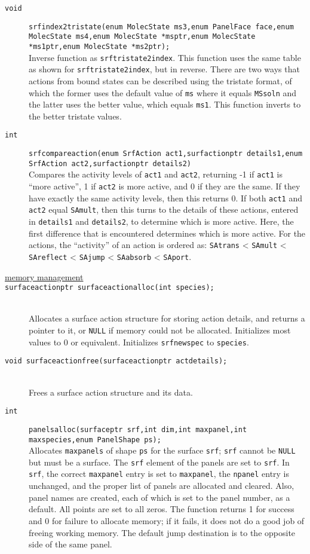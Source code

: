 \documentclass {book}
\newcommand {\ttt} {\texttt}
\begin{document}
\begin{description}
\item[\ttt{void}]
\ttt{srfindex2tristate(enum MolecState ms3,enum PanelFace face,enum MolecState ms4,enum MolecState *msptr,enum MolecState *ms1ptr,enum MolecState *ms2ptr);}
\hfill \\
Inverse function as \ttt{srftristate2index}. This function uses the same table as shown for \ttt{srftristate2index}, but in reverse. There are two ways that actions from bound states can be described using the tristate format, of which the former uses the default value of \ttt{ms} where it equals \ttt{MSsoln} and the latter uses the better value, which equals \ttt{ms1}. This function inverts to the better tristate values.

\item[\ttt{int}]
\ttt{srfcompareaction(enum SrfAction act1,surfactionptr details1,enum SrfAction act2,surfactionptr details2)}
\hfill \\
Compares the activity levels of \ttt{act1} and \ttt{act2}, returning -1 if \ttt{act1} is ``more active'', 1 if \ttt{act2} is more active, and 0 if they are the same. If they have exactly the same activity levels, then this returns 0. If both \ttt{act1} and \ttt{act2} equal \ttt{SAmult}, then this turns to the details of these actions, entered in \ttt{details1} and \ttt{details2}, to determine which is more active. Here, the first difference that is encountered determines which is more active. For the actions, the ``activity'' of an action is ordered as: \ttt{SAtrans} < \ttt{SAmult} < \ttt{SAreflect} < \ttt{SAjump} < \ttt{SAabsorb} < \ttt{SAport}.

\item[\underline{memory management}]

\item[\ttt{surfaceactionptr surfaceactionalloc(int species);}]
\hfill \\
Allocates a surface action structure for storing action details, and returns a pointer to it, or \ttt{NULL} if memory could not be allocated. Initializes most values to 0 or equivalent. Initializes \ttt{srfnewspec} to \ttt{species}.

\item[\ttt{void surfaceactionfree(surfaceactionptr actdetails);}]
\hfill \\
Frees a surface action structure and its data.

\item[\ttt{int}]
\ttt{panelsalloc(surfaceptr srf,int dim,int maxpanel,int maxspecies,enum PanelShape ps);}
\hfill \\
Allocates \ttt{maxpanels} of shape \ttt{ps} for the surface \ttt{srf}; \ttt{srf} cannot be \ttt{NULL} but must be a surface. The \ttt{srf} element of the panels are set to \ttt{srf}. In \ttt{srf}, the correct \ttt{maxpanel} entry is set to \ttt{maxpanel}, the \ttt{npanel} entry is unchanged, and the proper list of panels are allocated and cleared. Also, panel names are created, each of which is set to the panel number, as a default. All points are set to all zeros. The function returns 1 for success and 0 for failure to allocate memory; if it fails, it does not do a good job of freeing working memory. The default jump destination is to the opposite side of the same panel.


\end{description}
\end{document}
